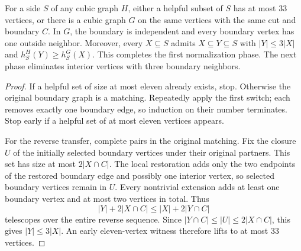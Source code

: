 \begin{theorem}
  \label{thm:lowerbounds-algebraic-boundary-normalization}
  \leanok
  For a side $S$ of any cubic graph $H$, either a helpful subset of
  $S$ has at most 33 vertices, or there is a cubic graph $G$ on the same
  vertices with the same cut and boundary $C$. In $G$, the boundary is
  independent and every boundary vertex has one outside neighbor.
  Moreover, every $X\subseteq S$ admits $X\subseteq Y\subseteq S$ with
  $|Y|\le3|X|$ and $h^H_S(Y)\ge h^G_S(X)$.
  This completes the first normalization phase. The next phase eliminates
  interior vertices with three boundary neighbors.
\end{theorem}
\begin{proof}
  \leanok
  If a helpful set of size at most eleven already exists, stop.
  Otherwise the original boundary graph is a matching. Repeatedly
  apply the first switch; each removes exactly one boundary edge, so
  induction on their number terminates. Stop early if a helpful set
  of at most eleven vertices appears.

  For the reverse transfer, complete pairs in the original matching.
  Fix the closure $U$ of the initially selected boundary vertices under
  their original partners. This set has size at most $2|X\cap C|$.
  The local restoration adds only the two endpoints of the restored
  boundary edge and possibly one interior vertex, so selected boundary
  vertices remain in $U$. Every nontrivial extension adds at least one
  boundary vertex and at most two vertices in total. Thus
  \[
    |Y|+2|X\cap C|\le |X|+2|Y\cap C|
  \]
  telescopes over the entire reverse sequence. Since
  $|Y\cap C|\le |U|\le2|X\cap C|$, this gives $|Y|\le3|X|$.
  An early eleven-vertex witness therefore lifts to at most 33 vertices.
\end{proof}

